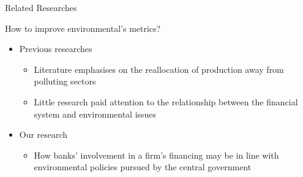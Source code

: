 \documentclass{beamer}
\begin{document}
\begin{frame}{Related Researches}

\centering How to improve environmental's metrics?
    \begin{itemize}
        \item{Previous researches}
        \begin{itemize}
            \item Literature emphasises on the reallocation of production away from polluting sectors 
            \item Little research paid attention to the relationship between the financial system and environmental issues
        \end{itemize}
        \item Our research
        \begin{itemize}
            \item How banks' involvement in a firm’s financing may be in line with environmental policies pursued by the central government
        \end{itemize}
    \end{itemize}
\end{frame}
\end{document}
